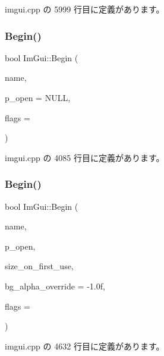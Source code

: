  imgui.\+cpp の 5999 行目に定義があります。

\mbox{\label{namespace_im_gui_a581e58db0bc930bafa4a5d23093a2b99}} 
\subsubsection{\texorpdfstring{Begin()}{Begin()}\hspace{0.1cm}{\footnotesize\ttfamily [1/2]}}
{\footnotesize\ttfamily bool Im\+Gui\+::\+Begin (\begin{DoxyParamCaption}\item[{const char $\ast$}]{name,  }\item[{bool $\ast$}]{p\+\_\+open = {\ttfamily NULL},  }\item[{\mbox{\hyperlink{imgui_8h_a0b8e067ab4f7a818828c8d89e531addc}{Im\+Gui\+Window\+Flags}}}]{flags = {} }\end{DoxyParamCaption})}



 imgui.\+cpp の 4085 行目に定義があります。

\mbox{\label{namespace_im_gui_a288e01ff1c8102d6374a6b1e409b9878}} 
\subsubsection{\texorpdfstring{Begin()}{Begin()}\hspace{0.1cm}{\footnotesize\ttfamily [2/2]}}
{\footnotesize\ttfamily bool Im\+Gui\+::\+Begin (\begin{DoxyParamCaption}\item[{const char $\ast$}]{name,  }\item[{bool $\ast$}]{p\+\_\+open,  }\item[{const \mbox{\hyperlink{struct_im_vec2}{Im\+Vec2}} \&}]{size\+\_\+on\+\_\+first\+\_\+use,  }\item[{float}]{bg\+\_\+alpha\+\_\+override = {\ttfamily -\/1.0f},  }\item[{\mbox{\hyperlink{imgui_8h_a0b8e067ab4f7a818828c8d89e531addc}{Im\+Gui\+Window\+Flags}}}]{flags = {} }\end{DoxyParamCaption})}



 imgui.\+cpp の 4632 行目に定義があります。

